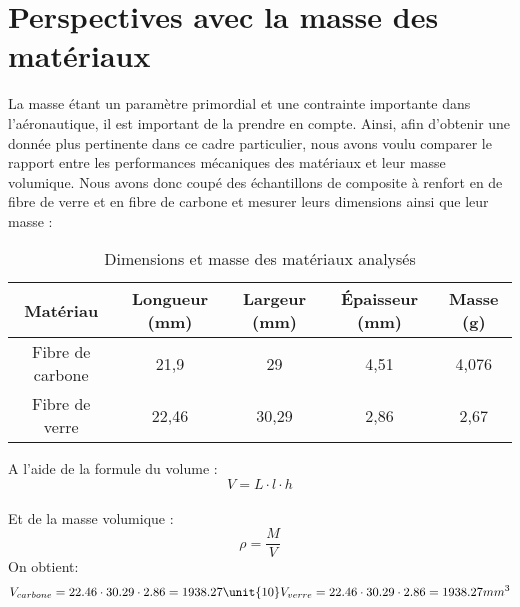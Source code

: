 \section{Perspectives avec la masse des matériaux}
La masse étant un paramètre primordial et une contrainte importante dans l'aéronautique, il est important de la prendre en compte.
Ainsi, afin d'obtenir une donnée plus pertinente dans ce cadre particulier, nous avons voulu comparer le rapport entre les performances mécaniques des matériaux et leur masse volumique.
Nous avons donc coupé des échantillons de composite à renfort en de fibre de verre et en fibre de carbone et mesurer leurs dimensions ainsi que leur masse :
\begin{table}[h!]
    \centering
    \begin{tabular}{|c|c|c|c|c|}
        \hline
        \textbf{Matériau} & \textbf{Longueur (mm)} & \textbf{Largeur (mm)} & \textbf{Épaisseur (mm)} & \textbf{Masse (g)} \\ \hline
        Fibre de carbone  & 21,9                   & 29                    & 4,51                    & 4,076              \\ \hline
        Fibre de verre    & 22,46                  & 30,29                 & 2,86                    & 2,67               \\ \hline
    \end{tabular}
    \caption{Dimensions et masse des matériaux analysés}
    \label{tab:dimensions_masse}
\end{table}

\noindent
A l'aide de la formule du volume : \[ V=L\cdot l\cdot h \] \\
Et de la masse volumique : \[\rho = \frac{M}{V}\]
On obtient:
\[
    V_{carbone} = 22.46\cdot 30.29 \cdot 2.86 = 1938.27 \unit{10} \\
    V_{verre} = 22.46\cdot 30.29 \cdot 2.86 = 1938.27 mm^3
\]
